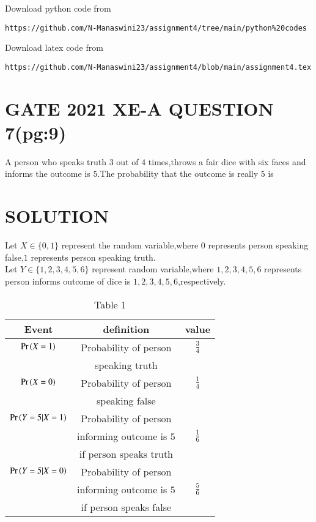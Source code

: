 \documentclass[journal,12pt,twocolumn]{IEEEtran}
\begin{document}
\renewcommand{\thefigure}{\theenumi}
\renewcommand{\thetable}{\theenumi}
Download python code from 
\begin{lstlisting}
https://github.com/N-Manaswini23/assignment4/tree/main/python%20codes
\end{lstlisting}
%
Download latex code from 
\begin{lstlisting}
https://github.com/N-Manaswini23/assignment4/blob/main/assignment4.tex
\end{lstlisting}
%

\section*{GATE 2021 XE-A QUESTION 7(pg:9)}
A person who speaks truth $3$ out of $4$ times,throws a fair dice with six faces and informs the outcome is $5$.The probability that the outcome is really $5$ is
\section*{SOLUTION}
Let $X \in \{0,1\}$ represent the random variable,where $0$ represents person speaking false,$1$ represents person speaking truth.\\
Let $Y \in \{1,2,3,4,5,6\}$  represent random variable,where $1,2,3,4,5,6$ represents person informs outcome of dice is $1,2,3,4,5,6$,respectively.\\


\begin{table}[h!]
\resizebox{9cm}{!}
{ 
\begin{tabular}{|c|c|c|}
\hline
Event & definition & value\\
\hline
$ \Pr\left(X=1\right) $ & Probability of person  & $\frac{3}{4}$\\
&speaking truth & \\
\hline
$ \Pr\left(X=0\right) $ & Probability of person & $\frac{1}{4}$ \\
& speaking false & \\
\hline
$\Pr\left(Y=5|X=1\right)$ & Probability of person  & \\
&  informing outcome is $5$ & $\frac{1}{6}$  \\
& if person speaks truth & \\
\hline
$\Pr\left(Y=5|X=0\right)$ & Probability of person & \\
& informing outcome is $5$ &  $\frac{5}{6}$ \\
& if person speaks false & \\ 
\hline
\end{tabular}
}
\caption{Table 1} 
\label{tab:1}
\end{table}
\end{document}
